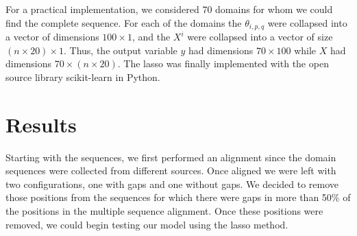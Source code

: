 \documentclass[a4paper, 12pt]{article}
\begin{document}
For a practical implementation, we considered 70 domains for whom we could find the complete sequence. For each of the domains the $\theta_{i,p,q}$ were collapsed into a vector of dimensions $100 \times 1$, and the $X^{i}$ were collapsed into a vector of size $ (n \times 20) \times 1$. Thus, the output variable $y$ had dimensions $70 \times 100$ while $X$ had dimensions $70 \times (n\times 20)$. The lasso was finally implemented with the open source library scikit-learn in Python. 

\section{Results}

Starting with the sequences, we first performed an alignment since the domain sequences were collected from different sources. Once aligned we were left with two configurations, one with gaps and one without gaps. We decided to remove those positions from the sequences for which there were gaps in more than 50\% of the positions in the multiple sequence alignment. Once these positions were removed, we could begin testing our model using the lasso method. 
\end{document}
